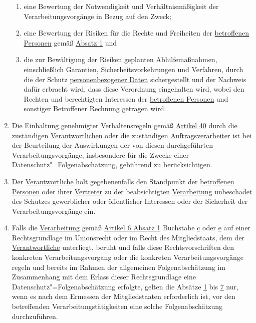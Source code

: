 \begin{enumerate}
\begin{enumerate}
    \item eine Bewertung der Notwendigkeit und Verhältnismäßigkeit der Verarbeitungsvorgänge in Bezug auf den Zweck;%
    \label{itm:35-7b}

    \item eine Bewertung der Risiken für die Rechte und Freiheiten der \hyperref[itm:04-1]{betroffenen Personen}
     gemäß \hyperref[itm:35-1]{Absatz 1} und%
    \label{itm:35-7c}

    \item die zur Bewältigung der Risiken geplanten Abhilfemaßnahmen, einschließlich Garantien, Sicherheitsvorkehrungen
     und Verfahren, durch die der Schutz \hyperref[itm:04-1]{personenbezogener Daten} sichergestellt und der Nachweis
     dafür erbracht wird, dass diese Verordnung eingehalten wird, wobei den Rechten und berechtigten Interessen
     der \hyperref[itm:04-1]{betroffenen Personen} und sonstiger Betroffener Rechnung getragen wird.%
    \label{itm:35-7d}

  \end{enumerate}

  \item Die Einhaltung genehmigter Verhaltensregeln gemäß \hyperref[ch:40]{Artikel 40} durch die zuständigen
   \hyperref[itm:04-7]{Verantwortlichen} oder die zuständigen \hyperref[itm:04-8]{Auftragsverarbeiter} ist bei der
    Beurteilung der Auswirkungen der von diesen durchgeführten Verarbeitungsvorgänge, insbesondere für die Zwecke einer
    Datenschutz"=Folgenabschätzung, gebührend zu berücksichtigen.%
  \label{itm:35-8}

  \item Der \hyperref[itm:04-7]{Verantwortliche} holt gegebenenfalls den Standpunkt der \hyperref[itm:04-1]
   {betroffenen Personen} oder ihrer \hyperref[itm:04-17]{Vertreter} zu der beabsichtigten \hyperref[itm:04-2]
   {Verarbeitung} unbeschadet des Schutzes gewerblicher oder öffentlicher Interessen oder der Sicherheit der
   Verarbeitungsvorgänge ein.%
  \label{itm:35-9}

  \item Falls die \hyperref[itm:04-2]{Verarbeitung} gemäß \hyperref[itm:06-1]{Artikel 6 Absatz 1} Buchstabe \hyperref
   [itm:06-1c]{c} oder \hyperref[itm:06-1e]{e} auf einer Rechtsgrundlage im Unionsrecht oder im Recht des
   Mitgliedstaats, dem der
   \hyperref[itm:04-7]{Verantwortliche} unterliegt, beruht und falls diese Rechtsvorschriften den konkreten
    Verarbeitungsvorgang oder die konkreten Verarbeitungsvorgänge regeln und bereits im Rahmen der allgemeinen
    Folgenabschätzung im Zusammenhang mit dem Erlass dieser Rechtsgrundlage eine Datenschutz"=Folgenabschätzung
    erfolgte, gelten die Absätze \hyperref[itm:35-1]{1} bis \hyperref[itm:35-7]{7} nur, wenn es nach dem Ermessen der
    Mitgliedstaaten erforderlich ist, vor den betreffenden Verarbeitungstätigkeiten eine solche Folgenabschätzung
    durchzuführen.%
  \label{itm:35-10}


\end{enumerate}

